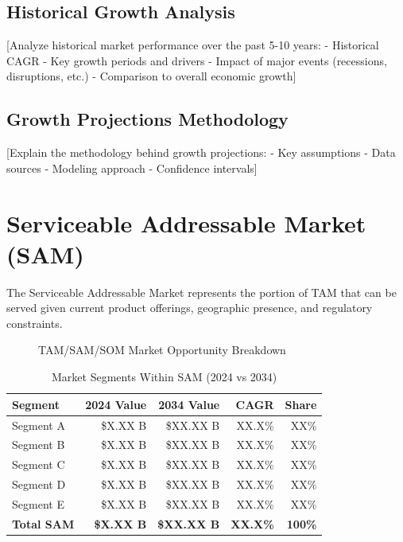 \documentclass[11pt,letterpaper]{report}
\begin{document}
\subsection{Historical Growth Analysis}

[Analyze historical market performance over the past 5-10 years:
- Historical CAGR
- Key growth periods and drivers
- Impact of major events (recessions, disruptions, etc.)
- Comparison to overall economic growth]

\subsection{Growth Projections Methodology}

[Explain the methodology behind growth projections:
- Key assumptions
- Data sources
- Modeling approach
- Confidence intervals]

\section{Serviceable Addressable Market (SAM)}

The Serviceable Addressable Market represents the portion of TAM that can be served given current product offerings, geographic presence, and regulatory constraints.


\begin{figure}[htbp]
\centering
\caption{TAM/SAM/SOM Market Opportunity Breakdown}
\label{fig:tam_sam_som}
\end{figure}

\begin{table}[htbp]
\centering
\caption{Market Segments Within SAM (2024 vs 2034)}
\begin{tabular}{@{}lrrrr@{}}
\toprule
\textbf{Segment} & \textbf{2024 Value} & \textbf{2034 Value} & \textbf{CAGR} & \textbf{Share} \\
\midrule
Segment A & \$X.XX B & \$XX.XX B & XX.X\% & XX\% \\
\rowcolor{tablealt} Segment B & \$X.XX B & \$XX.XX B & XX.X\% & XX\% \\
Segment C & \$X.XX B & \$XX.XX B & XX.X\% & XX\% \\
\rowcolor{tablealt} Segment D & \$X.XX B & \$XX.XX B & XX.X\% & XX\% \\
Segment E & \$X.XX B & \$XX.XX B & XX.X\% & XX\% \\
\midrule
\textbf{Total SAM} & \textbf{\$X.XX B} & \textbf{\$XX.XX B} & \textbf{XX.X\%} & \textbf{100\%} \\
\bottomrule
\end{tabular}
\label{tab:sam_segments}
\end{table}
\end{document}
